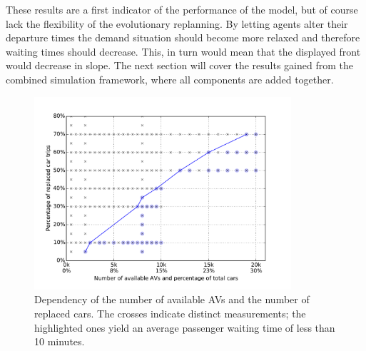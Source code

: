 These results are a first indicator of the performance of the model, but of course
lack the flexibility of the evolutionary replanning. By letting agents alter their
departure times the demand situation should become more relaxed and therefore
waiting times should decrease. This, in turn would mean that the displayed front
would decrease in slope. The next section will cover the results gained from the
combined simulation framework, where all components are added together.

\begin{figure}
    \centering
    \includegraphics[width=0.85\textwidth]{figures/replacementwaiting.pdf}
    \caption{Dependency of the number of available AVs and the number of replaced
    cars. The crosses indicate distinct measurements; the highlighted ones yield
    an average passenger waiting time of less than 10 minutes.}
    \label{fig:replacementwaiting}
\end{figure}
